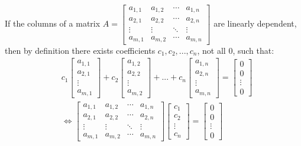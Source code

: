 \documentclass{article}
\begin{document}
\vspace{5mm}

If the columns of a matrix \(A = \begin{bmatrix}
a_{1,1} & a_{1,2} & \cdots & a_{1,n} \\ 
a_{2,1} & a_{2,2} & \cdots & a_{2,n} \\ 
\vdots & \vdots & \ddots & \vdots \\ 
a_{m,1} & a_{m,2} & \cdots & a_{m,n} 
\end{bmatrix}\) are linearly dependent, then by definition there exists coefficients \(c_1, c_2, ..., c_n\), not all \(0\), such that:
\begin{align*}
& c_1\begin{bmatrix} a_{1,1} \\ a_{2,1} \\ \vdots \\ a_{m,1} \end{bmatrix}
+ c_2\begin{bmatrix} a_{1,2} \\ a_{2,2} \\ \vdots \\ a_{m,2} \end{bmatrix}
+ ... + c_n\begin{bmatrix} a_{1,n} \\ a_{2,n} \\ \vdots \\ a_{m,n} \end{bmatrix}
= \begin{bmatrix} 0 \\ 0 \\ \vdots \\ 0 \end{bmatrix} \\
& \iff \begin{bmatrix}
a_{1,1} & a_{1,2} & \cdots & a_{1,n} \\ 
a_{2,1} & a_{2,2} & \cdots & a_{2,n} \\ 
\vdots & \vdots & \ddots & \vdots \\ 
a_{m,1} & a_{m,2} & \cdots & a_{m,n} 
\end{bmatrix}\begin{bmatrix} c_1 \\ c_2 \\ \vdots \\ c_n \end{bmatrix} = \begin{bmatrix} 0 \\ 0 \\ \vdots \\ 0 \end{bmatrix}
\end{align*}
\end{document}
